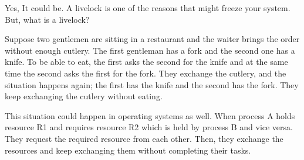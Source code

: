 
Yes, It could be. A livelock is one of the reasons that might freeze your system. But, what is a livelock?

Suppose two gentlemen are sitting in a restaurant and the waiter brings the order without enough cutlery. The first gentleman has a fork and the second one has a knife. To be able to eat, the first asks the second for the knife and at the same time the second asks the first for the fork. They exchange the cutlery, and the situation happens again; the first has the knife and the second has the fork. They keep exchanging the cutlery without eating.

This situation could happen in operating systems as well. When process A holds resource R1 and requires resource R2 which is held by process B and vice versa. They request the required resource from each other. Then, they exchange the resources and keep exchanging them without completing their tasks.

